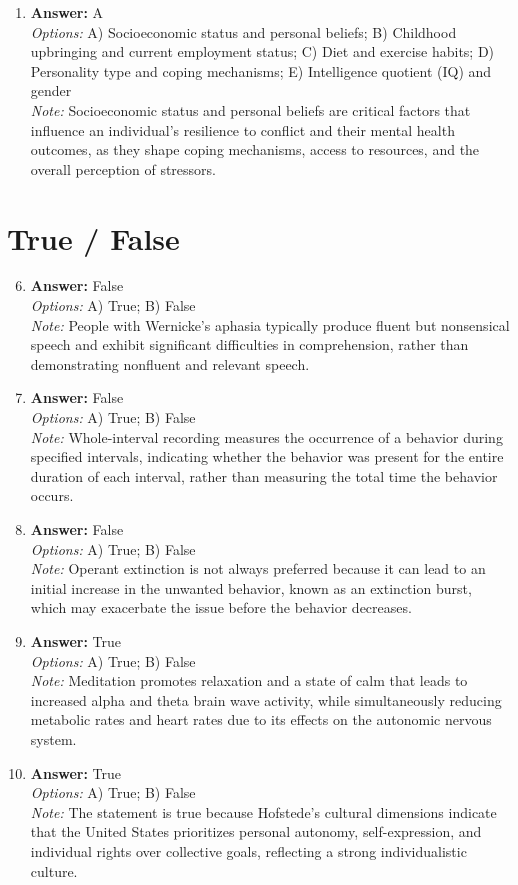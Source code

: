 \documentclass[12pt]{article}
\begin{document}
\begin{enumerate}[label=\arabic*.]
\item \textbf{Answer:} A
\\ \textit{Options:} A) Socioeconomic status and personal beliefs; B) Childhood upbringing and current employment status; C) Diet and exercise habits; D) Personality type and coping mechanisms; E) Intelligence quotient (IQ) and gender
\\ \textit{Note:} Socioeconomic status and personal beliefs are critical factors that influence an individual's resilience to conflict and their mental health outcomes, as they shape coping mechanisms, access to resources, and the overall perception of stressors.
\end{enumerate}

\section*{True / False}
\begin{enumerate}[label=\arabic*.]
\setcounter{enumi}{5}
\item \textbf{Answer:} False
\\ \textit{Options:} A) True; B) False
\\ \textit{Note:} People with Wernicke's aphasia typically produce fluent but nonsensical speech and exhibit significant difficulties in comprehension, rather than demonstrating nonfluent and relevant speech.
\item \textbf{Answer:} False
\\ \textit{Options:} A) True; B) False
\\ \textit{Note:} Whole-interval recording measures the occurrence of a behavior during specified intervals, indicating whether the behavior was present for the entire duration of each interval, rather than measuring the total time the behavior occurs.
\item \textbf{Answer:} False
\\ \textit{Options:} A) True; B) False
\\ \textit{Note:} Operant extinction is not always preferred because it can lead to an initial increase in the unwanted behavior, known as an extinction burst, which may exacerbate the issue before the behavior decreases.
\item \textbf{Answer:} True
\\ \textit{Options:} A) True; B) False
\\ \textit{Note:} Meditation promotes relaxation and a state of calm that leads to increased alpha and theta brain wave activity, while simultaneously reducing metabolic rates and heart rates due to its effects on the autonomic nervous system.
\item \textbf{Answer:} True
\\ \textit{Options:} A) True; B) False
\\ \textit{Note:} The statement is true because Hofstede's cultural dimensions indicate that the United States prioritizes personal autonomy, self-expression, and individual rights over collective goals, reflecting a strong individualistic culture.
\end{enumerate}
\end{document}
